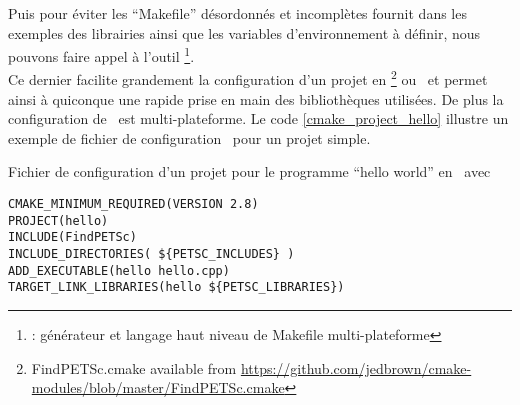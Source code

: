 Puis pour éviter les ``Makefile'' désordonnés et incomplètes fournit dans les exemples des librairies ainsi que les variables d'environnement à définir, nous pouvons faire appel à l'outil \cmake\footnote{\cmake: générateur et langage haut niveau de Makefile multi-plateforme}.\\

Ce dernier facilite grandement la configuration d'un projet en \petsc\footnote{FindPETSc.cmake available from \url{https://github.com/jedbrown/cmake-modules/blob/master/FindPETSc.cmake}} ou \slepc\ et permet ainsi à quiconque une rapide prise en main des bibliothèques utilisées. De plus la configuration de \cmake\ est multi-plateforme. Le code \ref{cmake_project_hello} illustre un exemple de fichier de configuration \cmake\ pour un projet simple.

\begin{algorithm}[h]
  \caption{Fichier de configuration d'un projet pour le programme ``hello world'' en \petsc\ avec \cmake}
  \label{cmake_project_hello}
\begin{verbatim}
CMAKE_MINIMUM_REQUIRED(VERSION 2.8)
PROJECT(hello)
INCLUDE(FindPETSc)
INCLUDE_DIRECTORIES( ${PETSC_INCLUDES} )
ADD_EXECUTABLE(hello hello.cpp)
TARGET_LINK_LIBRARIES(hello ${PETSC_LIBRARIES})
\end{verbatim}
\end{algorithm}

